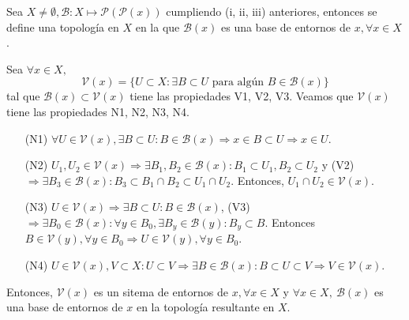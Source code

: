 \begin{prop}
  Sea $ X \neq \emptyset, \mathcal{B}: X \mapsto \mathcal{P}(\mathcal{P}(x))$ cumpliendo (i, ii, iii) anteriores, entonces se define una topología en $X$ en la que $ \mathcal{B}(x)$ es una base de entornos de $x, \forall x \in X$.
\end{prop}

\begin{dem}
  Sea $\forall x \in X,$
  \[
    \mathcal{V}(x) = \{ U \subset X :\exists B \subset U  \text{ para algún } B \in \mathcal{B}(x) \}
  \]
  tal que $\mathcal{B}(x) \subset \mathcal{V}(x)$ tiene las propiedades V1, V2, V3. Veamos que $\mathcal{V}(x)$ tiene las propiedades N1, N2, N3, N4.
  \begin{enumerate}[label=(\roman*)]
    \item [(N1)] $\forall U \in \mathcal{V}(x), \exists B \subset U : B \in \mathcal{B}(x) \Rightarrow x \in B \subset U \Rightarrow x \in U$.
    \item [(N2)] $U_{1}, U_{2} \in \mathcal{V}(x) \Rightarrow \exists B_{1}, B_{2} \in \mathcal{B}(x): B_{1} \subset U_{1}, B_{2} \subset U_{2}$ y (V2) $\Rightarrow \exists B_{3} \in \mathcal{B}(x): B_{3} \subset B_{1} \cap B_{2} \subset U_{1} \cap U_{2}$. Entonces, $U_{1} \cap U_{2} \in \mathcal{V}(x)$.
    \item [(N3)] $U \in \mathcal{V}(x) \Rightarrow \exists B \subset U: B \in \mathcal{B}(x)$, (V3) $ \Rightarrow \exists B_{0} \in \mathcal{B}(x) : \forall y \in B_{0}, \exists B_{y} \in \mathcal{B}(y): B_{y} \subset B$. Entonces $B \in \mathcal{V}(y), \forall y \in B_{0} \Rightarrow U \in \mathcal{V}(y), \forall y \in B_{0}$.
    \item [(N4)] $U \in \mathcal{V}(x), V \subset X: U \subset V \Rightarrow \exists B \in \mathcal{B}(x) : B \subset U \subset V \Rightarrow V \in \mathcal{V}(x)$.
  \end{enumerate}
  
  Entonces, $\mathcal{V}(x)$ es un sitema de entornos de $x, \forall x \in X$ y $\forall x \in X, \ \mathcal{B}(x)$ es una base de entornos de $x$ en la topología resultante en $X$.
\end{dem}
